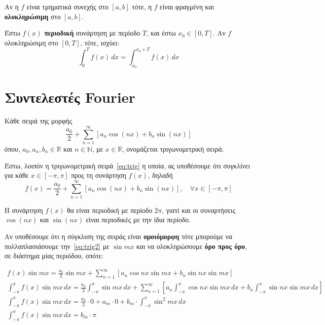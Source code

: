 \documentclass[a4paper,table]{report}
\begin{document}
\begin{prop}
  Αν η $f$ είναι τμηματικά συνεχής στο $ [a,b] $ τότε, η $f$ είναι φραγμένη και 
  \textbf{ολοκληρώσιμη} στο $ [a,b] $.
\end{prop}

\begin{prop}
  Έστω $ f(x) $ \textbf{περιοδική} συνάρτηση με περίοδο $T$, και έστω 
  $ x_{0} \in [0,T] $.  Αν $f$ ολοκληρώσιμη στο $ [0,T] $, τότε, ισχύει:
  \[
    \int _{0}^{T} f(x) \,{dx} = \int _{x_{0}}^{x_{0}+T} f(x) \,{dx}  
  \] 
\end{prop}


\section{Συντελεστές \textlatin{Fourier}}

\begin{dfn}
  Κάθε σειρά της μορφής 
  \begin{equation}\label{eq:trig}
    \frac{a_{0}}{2} + \sum_{n=1}^{\infty} [a_{n} \cos{(nx)} + b_{n} \sin{(nx)}] 
  \end{equation} 
  όπου, $ a_{0}, a_{n}, b_{n} \in \mathbb{R} $ και $ n \in \mathbb{N} $, με 
  $ x \in \mathbb{R} $, ονομάζεται \textcolor{Col1}{τριγωνομετρική σειρά}.
\end{dfn}

Έστω, λοιπόν η τριγωνομετρική σειρά~\eqref{eq:trig} η οποία, ας υποθέσουμε ότι 
συγκλίνει για κάθε 
$ x \in [- \pi , \pi] $ προς τη συνάρτηση $ f(x) $, δηλαδή
\begin{equation}\label{eq:trig2}
  f(x) = \frac{a_{0}}{2} + \sum_{n=1}^{\infty} [a_{n} \cos{(nx)} + b_{n} \sin{(nx)}],
  \quad \forall x \in [- \pi , \pi]
\end{equation} 
\begin{rem}
  Η συνάρτηση $ f(x) $ θα είναι περιοδική με περίοδο $ 2 \pi $, γιατί και οι
  συναρτήσεις $ \cos{(nx)} $ και $ \sin{(nx)} $ είναι περιοδικές με την ίδια
  περίοδο.   
\end{rem}
Αν υποθέσουμε ότι η σύγκλιση της σειράς είναι \textbf{ομοιόμορφη} τότε μπορούμε να 
πολλαπλασιάσουμε την~\eqref{eq:trig2} με $ \sin{mx} $ και να ολοκληρώσουμε 
\textbf{όρο προς όρο}, σε διάστημα μίας περιόδου, οπότε: 

\begin{gather*}
  f(x) \sin{mx} = \frac{a_{0}}{2} \sin{mx} + \sum_{n=1}^{\infty} 
  [a_{n} \cos{nx} \sin{mx} + b_{n} \sin{nx} \sin{mx}]   \\
  \int _{- \pi} ^{\pi} f(x) \sin{mx} \,{dx} = \frac{a_{0}}{2} \int _{- \pi}^{\pi} 
  \sin{mx} \,{dx} + \sum_{n=1}^{\infty} \left[a_{n} \int _{- \pi}^{\pi} 
    \cos{nx} \sin{mx}  \,{dx} + b_{n} \int _{- \pi }^{\pi} \sin{nx} \sin{mx} 
  \,{dx}\right] \\
  \int _{- \pi }^{\pi} f(x) \sin{mx} \,{dx} = \frac{a_{0}}{2} \cdot 0 + 
  a_{m}\cdot 0 + b_{m} \cdot \int _{- \pi}^{\pi } \sin^{2}{mx} \,{dx} \\
  \int _{- \pi }^{\pi} f(x) \sin{mx} \,{dx} =  b_{m} \cdot \pi 
\end{gather*}   
\end{document}
